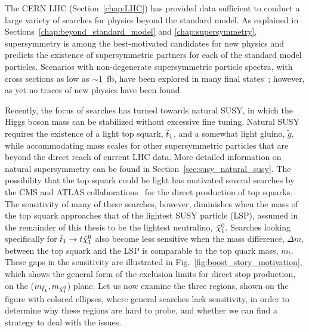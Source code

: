 

The CERN LHC (Section~\ref{chap:LHC}) has provided data sufficient to conduct a large variety of
searches for physics beyond the standard model.
As explained in Sections~\ref{chap:beyond_standard_model} and \ref{chap:supersymmetry},
supersymmetry is among the best-motivated candidates for new physics and predicts the existence of
supersymmetric partners for each of the standard model particles.  
Scenarios with non-degenerate supersymmetric particle spectra, with cross sections as low as
${\sim}1$~fb, have been explored in many final states~\cite{CMS-PAS-SUS-13-020}; however, as yet no
traces of new physics have been found.  

Recently, the focus of searches has turned towards natural SUSY, in which the Higgs boson mass can
be stabilized without excessive fine tuning. Natural SUSY requires the existence of a light top
squark, $\tilde{t}_1$, and a somewhat light gluino, $\tilde{g}$, while accommodating mass scales for
other supersymmetric particles that are beyond the direct reach of current LHC data.  
More detailed information on natural supersymmetry can be found in
Section~\ref{sec:susy_natural_susy}. 
The possibility that the top squark could be light has motivated several searches by the CMS and
ATLAS
collaborations~\cite{Aad:2013ija,Aad:2014qaa,Aad:2014bva,Aad:2014kva,Aad:2014kra,Chatrchyan:2013xna,
Chatrchyan:2013mya,Khachatryan:2014doa} for the direct production of top squarks. The sensitivity of
many of these searches, however, diminishes when the mass of the top squark approaches that of the
lightest SUSY particle (LSP), assumed in the remainder of this thesis to be the lightest neutralino,
$\tilde{\chi}_1^0$. Searches looking specifically for $\tilde{t}_1 \rightarrow t \tilde{\chi}_1^0$ also become less sensitive
when the mass difference, $\Delta m$, between the top squark and the LSP is comparable to the top
quark mass, $m_t$. 
These gaps in the sensitivity are illustrated in Fig.~\ref{fig:boost_story_motivation}, which shows
the general form of the exclusion limits for direct stop production, on the
($m_{\tilde{t}_1},m_{\tilde{\chi}_1^0}$) plane. 
Let us now examine the three regions, shown on the figure with colored ellipses, where general
searches lack sensitivity, in order to determine why these regions are hard to probe, and whether we
can find a strategy to deal with the issues. 

